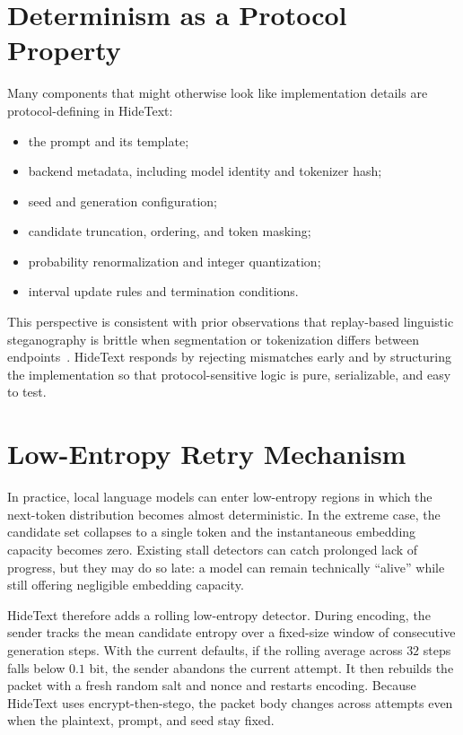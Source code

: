 \documentclass[sigconf,review,anonymous]{acmart}
\begin{document}
\section{Determinism as a Protocol Property}

Many components that might otherwise look like implementation details are protocol-defining in HideText:

\begin{itemize}
    \item the prompt and its template;
    \item backend metadata, including model identity and tokenizer hash;
    \item seed and generation configuration;
    \item candidate truncation, ordering, and token masking;
    \item probability renormalization and integer quantization;
    \item interval update rules and termination conditions.
\end{itemize}

This perspective is consistent with prior observations that replay-based linguistic steganography is brittle when segmentation or tokenization differs between endpoints~\cite{nozaki2022addressing}. HideText responds by rejecting mismatches early and by structuring the implementation so that protocol-sensitive logic is pure, serializable, and easy to test.

\section{Low-Entropy Retry Mechanism}

In practice, local language models can enter low-entropy regions in which the next-token distribution becomes almost deterministic. In the extreme case, the candidate set collapses to a single token and the instantaneous embedding capacity becomes zero. Existing stall detectors can catch prolonged lack of progress, but they may do so late: a model can remain technically ``alive'' while still offering negligible embedding capacity.

HideText therefore adds a rolling low-entropy detector. During encoding, the sender tracks the mean candidate entropy over a fixed-size window of consecutive generation steps. With the current defaults, if the rolling average across \(32\) steps falls below \(0.1\) bit, the sender abandons the current attempt. It then rebuilds the packet with a fresh random salt and nonce and restarts encoding. Because HideText uses encrypt-then-stego, the packet body changes across attempts even when the plaintext, prompt, and seed stay fixed.
\end{document}
